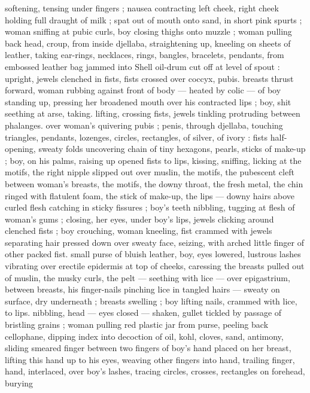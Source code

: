 softening, tensing under fingers ; nausea contracting left cheek, right 
cheek holding full draught of milk ; spat out of mouth onto sand, in 
short pink spurts ; woman sniffing at pubic curls, boy closing thighs 
onto muzzle ; woman pulling back head, croup, from inside djellaba, 
straightening up, kneeling on sheets of leather, taking ear-rings, 
necklaces, rings, bangles, bracelets, pendants, from embossed 
leather bag jammed into Shell oil-drum cut off at level of spout : 
upright, jewels clenched in fists, fists crossed over coccyx, pubis. 
breasts thrust forward, woman rubbing against front of body --- 
heated by colic --- of boy standing up, pressing her broadened 
mouth over his contracted lips ; boy, shit seething at arse, taking. 
lifting, crossing fists, jewels tinkling protruding between phalanges. 
over woman's quivering pubis ; penis, through djellaba, touching 
triangles, pendants, lozenges, circles, rectangles, of silver, of ivory : 
fists half-opening, sweaty folds uncovering chain of tiny hexagons, 
pearls, sticks of make-up ; boy, on his palms, raising up opened fists 
to lips, kissing, sniffing, licking at the motifs, the right nipple slipped 
out over muslin, the motifs, the pubescent cleft between woman's 
breasts, the motifs, the downy throat, the fresh metal, the chin ringed 
with flatulent foam, the stick of make-up, the lips --- downy hairs 
above curled flesh catching in sticky fissures ; boy's teeth nibbling, 
tugging at flesh of woman's gums ; closing, her eyes, under boy's 
lips, jewels clicking around clenched fists ; boy crouching, woman 
kneeling, fist crammed with jewels separating hair pressed down over 
sweaty face, seizing, with arched little finger of other packed fist. 
small purse of bluish leather, boy, eyes lowered, lustrous lashes 
vibrating over erectile epidermis at top of cheeks, caressing the 
breasts pulled out of muslin, the musky curls, the pelt --- seething 
with lice --- over epigastrium, between breasts, his finger-nails 
pinching lice in tangled hairs --- sweaty on surface, dry underneath 
; breasts swelling ; boy lifting nails, crammed with lice, to lips. 
nibbling, head --- eyes closed --- shaken, gullet tickled by passage 
of bristling grains ; woman pulling red plastic jar from purse, peeling 
back cellophane, dipping index into decoction of oil, kohl, cloves, 
sand, antimony, sliding smeared finger between two fingers of boy's 
hand placed on her breast, lifting this hand up to his eyes, weaving 
other fingers into hand, trailing finger, hand, interlaced, over boy's 
lashes, tracing circles, crosses, rectangles on forehead, burying 
